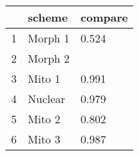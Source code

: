 \begin{table}[ht]
\centering
\begin{tabular}{rll}
  \hline
 & scheme & compare \\ 
  \hline
1 & Morph 1 & 0.524 \\ 
  2 & Morph 2 &  \\ 
  3 & Mito 1 & 0.991 \\ 
  4 & Nuclear & 0.979 \\ 
  5 & Mito 2 & 0.802 \\ 
  6 & Mito 3 & 0.987 \\ 
   \hline
\end{tabular}
\end{table}
